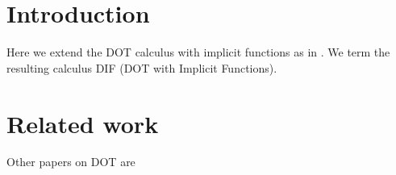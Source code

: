 \section{Introduction}

Here we extend the DOT calculus \cite{AGORS16} with implicit functions as in
\cite{OBLB18}. We term the resulting calculus DIF (DOT with Implicit Functions).

\section{Related work}

Other papers on DOT are \cite{ARO14, AR17, AR16, AMO12}
